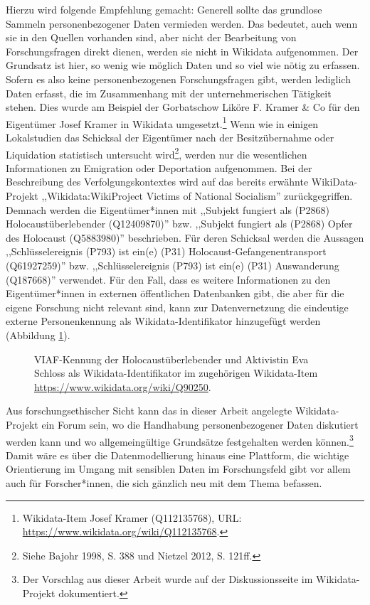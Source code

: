 Hierzu wird folgende Empfehlung gemacht: Generell sollte das grundlose Sammeln personenbezogener Daten vermieden werden. Das bedeutet, auch wenn sie in den Quellen vorhanden sind, aber nicht der Bearbeitung von Forschungsfragen direkt dienen, werden sie nicht in Wikidata aufgenommen. Der Grundsatz ist hier, so wenig wie möglich Daten und so viel wie nötig zu erfassen. Sofern es also keine personenbezogenen Forschungsfragen gibt, werden lediglich Daten erfasst, die im Zusammenhang mit der unternehmerischen Tätigkeit stehen. Dies wurde am Beispiel der Gorbatschow Liköre F. Kramer \& Co für den Eigentümer Josef Kramer in Wikidata umgesetzt.\footnote{Wikidata-Item Josef Kramer (Q112135768), URL: \url{https://www.wikidata.org/wiki/Q112135768}.} Wenn wie in einigen Lokalstudien das Schicksal der Eigentümer nach der Besitzübernahme oder Liquidation statistisch untersucht wird\footnote{Siehe Bajohr 1998, S. 388 und Nietzel 2012, S. 121ff.}, werden nur die wesentlichen Informationen zu Emigration oder Deportation aufgenommen. Bei der Beschreibung des Verfolgungskontextes wird auf das bereits erwähnte WikiData-Projekt ,,Wikidata:WikiProject Victims of National Socialism'' zurückgegriffen. Demnach werden die Eigentümer*innen mit ,,Subjekt fungiert als (P2868) Holocaustüberlebender (Q12409870)'' bzw. ,,Subjekt fungiert als (P2868) Opfer des Holocaust (Q5883980)'' beschrieben. Für deren Schicksal werden die Aussagen ,,Schlüsselereignis (P793) ist ein(e) (P31) Holocaust-Gefangenentransport (Q61927259)'' bzw. ,,Schlüsselereignis (P793) ist ein(e) (P31) Auswanderung (Q187668)'' verwendet. Für den Fall, dass es weitere Informationen zu den Eigentümer*innen in externen öffentlichen Datenbanken gibt, die aber für die eigene Forschung nicht relevant sind, kann zur Datenvernetzung die eindeutige externe Personenkennung als Wikidata-Identifikator hinzugefügt werden (Abbildung \ref{fig:wikidataidentificator}).

\begin{figure}[h]
    \centering
    \caption[Eindeutige Identifikatoren in Wikidata]{VIAF-Kennung der Holocaustüberlebender und Aktivistin Eva Schloss als Wikidata-Identifikator im zugehörigen Wikidata-Item \url{https://www.wikidata.org/wiki/Q90250}.}
    \label{fig:wikidataidentificator}
\end{figure}

Aus forschungsethischer Sicht kann das in dieser Arbeit angelegte Wikidata-Projekt ein Forum sein, wo die Handhabung personenbezogener Daten diskutiert werden kann und wo allgemeingültige Grundsätze festgehalten werden können.\footnote{Der Vorschlag aus dieser Arbeit wurde auf der Diskussionsseite im Wikidata-Projekt dokumentiert.} Damit wäre es über die Datenmodellierung hinaus eine Plattform, die wichtige Orientierung im Umgang mit sensiblen Daten im Forschungsfeld gibt vor allem auch für Forscher*innen, die sich gänzlich neu mit dem Thema befassen.

